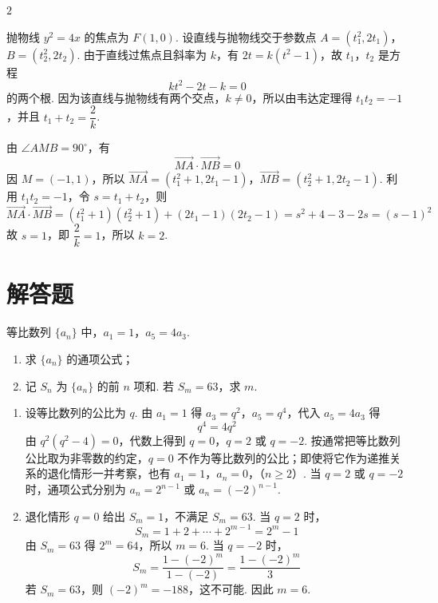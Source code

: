 \begin{answer}
\(2\)
\end{answer}

\begin{solution}
抛物线 \(y^2=4x\) 的焦点为 \(F(1,0)\). 设直线与抛物线交于参数点
\(A=(t_1^2,2t_1)\)，\(B=(t_2^2,2t_2)\).
由于直线过焦点且斜率为 \(k\)，有 \(2t=k(t^2-1)\)，故 \(t_1\)，\(t_2\) 是方程
\[
kt^2-2t-k=0
\]
的两个根. 因为该直线与抛物线有两个交点，\(k\ne0\)，所以由韦达定理得 \(t_1t_2=-1\)，并且 \(t_1+t_2=\dfrac2k\).

由 \(\angle AMB=90^\circ\)，有
\[
\overrightarrow{MA}\cdot\overrightarrow{MB}=0
\]
因 \(M=(-1,1)\)，所以
\(\overrightarrow{MA}=(t_1^2+1,2t_1-1)\)，\(\overrightarrow{MB}=(t_2^2+1,2t_2-1)\).
利用 \(t_1t_2=-1\)，令 \(s=t_1+t_2\)，则
\[
\overrightarrow{MA}\cdot\overrightarrow{MB}
=(t_1^2+1)(t_2^2+1)+(2t_1-1)(2t_2-1)
=s^2+4-3-2s=(s-1)^2
\]
故 \(s=1\)，即 \(\dfrac2k=1\)，所以 \(k=2\).
\end{solution}

\section{解答题}

\begin{problem}
等比数列 \(\{a_n\}\) 中，\(a_1=1\)，\(a_5=4a_3\).

\begin{enumerate}
\item 求 \(\{a_n\}\) 的通项公式；
\item 记 \(S_n\) 为 \(\{a_n\}\) 的前 \(n\) 项和. 若 \(S_m=63\)，求 \(m\).
\end{enumerate}
\end{problem}

\begin{solution}
\begin{enumerate}
\item 设等比数列的公比为 \(q\). 由 \(a_1=1\) 得 \(a_3=q^2\)，\(a_5=q^4\)，代入 \(a_5=4a_3\) 得
\[
q^4=4q^2
\]
由 \(q^2(q^2-4)=0\)，代数上得到 \(q=0\)，\(q=2\) 或 \(q=-2\). 按通常把等比数列公比取为非零数的约定，\(q=0\) 不作为等比数列的公比；即使将它作为递推关系的退化情形一并考察，也有
\(a_1=1\)，\(a_n=0\)，（\(n\ge2\)）.
当 \(q=2\) 或 \(q=-2\) 时，通项公式分别为
\(a_n=2^{n-1}\) 或 \(a_n=(-2)^{n-1}\).
\item 退化情形 \(q=0\) 给出 \(S_m=1\)，不满足 \(S_m=63\). 当 \(q=2\) 时，
\[
S_m=1+2+\cdots+2^{m-1}=2^m-1
\]
由 \(S_m=63\) 得 \(2^m=64\)，所以 \(m=6\). 当 \(q=-2\) 时，
\[
S_m=\dfrac{1-(-2)^m}{1-(-2)}=\dfrac{1-(-2)^m}{3}
\]
若 \(S_m=63\)，则 \((-2)^m=-188\)，这不可能. 因此 \(m=6\).
\end{enumerate}
\end{solution}

